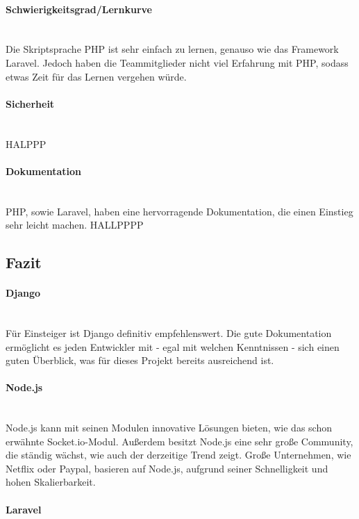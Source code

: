 \documentclass[11pt]{article}
\begin{document}
\paragraph{Schwierigkeitsgrad/Lernkurve} \mbox{}\\
Die Skriptsprache PHP ist sehr einfach zu lernen, genauso wie das Framework Laravel. Jedoch haben die Teammitglieder nicht viel Erfahrung mit PHP, sodass etwas Zeit für das Lernen vergehen würde.

\paragraph{Sicherheit} \mbox{}\\
HALPPP

\paragraph{Dokumentation} \mbox{}\\
PHP, sowie Laravel, haben eine hervorragende Dokumentation, die einen Einstieg sehr leicht machen. HALLPPPP

\subsection{Fazit}
\paragraph{Django} \mbox{}\\
F\"ur Einsteiger ist Django definitiv empfehlenswert. Die gute Dokumentation erm\"oglicht es jeden Entwickler mit - egal mit welchen Kenntnissen - sich einen guten \"Uberblick, was f\"ur dieses Projekt bereits ausreichend ist.
\paragraph{Node.js} \mbox{}\\
Node.js kann mit seinen Modulen innovative L\"osungen bieten, wie das schon erw\"ahnte Socket.io-Modul. Au{\ss}erdem besitzt Node.js eine sehr gro{\ss}e Community, die st\"andig w\"achst, wie auch der derzeitige Trend zeigt. Gro{\ss}e Unternehmen, wie Netflix oder Paypal, basieren auf Node.js, aufgrund seiner Schnelligkeit und hohen Skalierbarkeit.
\paragraph{Laravel} \mbox{}\\
\end{document}
